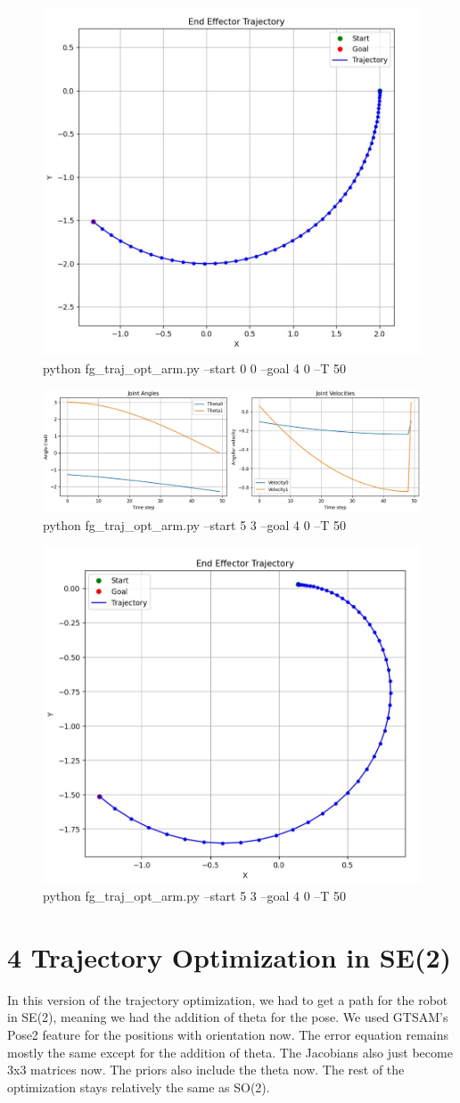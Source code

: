 \documentclass{article}
\begin{document}
\begin{figure} [H]
    \centering
    \includegraphics[width=0.5\linewidth]{latex_media/fg_traj_opt_arm_22.jpg}
    \caption{python fg\_traj\_opt\_arm.py --start 0 0 --goal 4 0 --T 50}
    \label{fig:enter-label}
\end{figure}

\begin{figure} [H]
    \centering
    \includegraphics[width=0.5\linewidth]{latex_media/fg_traj_opt_arm_3.jpg}
    \caption{python fg\_traj\_opt\_arm.py --start 5 3 --goal 4 0 --T 50}
    \label{fig:enter-label}
\end{figure}

\begin{figure} [H]
    \centering
    \includegraphics[width=0.5\linewidth]{latex_media/fg_traj_opt_arm_33.jpg}
    \caption{python fg\_traj\_opt\_arm.py --start 5 3 --goal 4 0 --T 50}
    \label{fig:enter-label}
\end{figure}


\section{4 Trajectory Optimization in SE(2)}
In this version of the trajectory optimization, we had to get a path for the robot in SE(2), meaning we had the addition of theta for the pose. We used GTSAM's Pose2 feature for the positions with orientation now. The error equation remains mostly the same except for the addition of theta. The Jacobians also just become 3x3 matrices now. The priors also include the theta now. The rest of the optimization stays relatively the same as SO(2).
\end{document}
